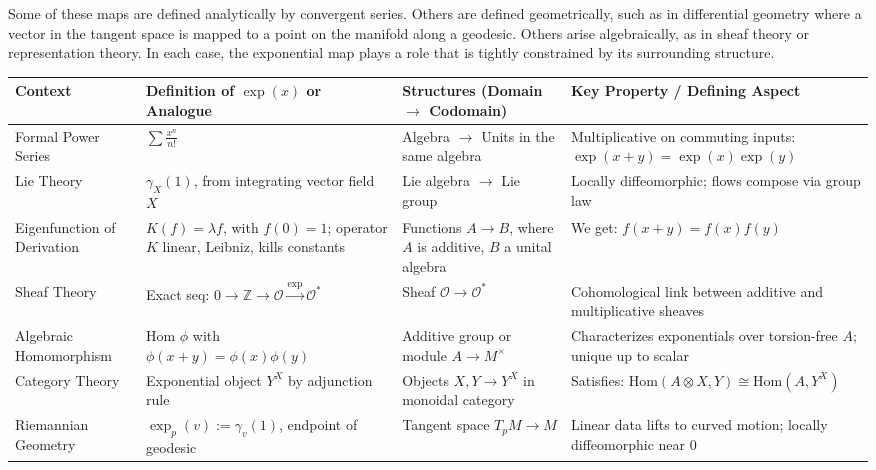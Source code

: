 Some of these maps are defined analytically by convergent series. Others are defined geometrically, such as in differential geometry where a vector in the tangent space is mapped to a point on the manifold along a geodesic. Others arise algebraically, as in sheaf theory or representation theory. In each case, the exponential map plays a role that is tightly constrained by its surrounding structure.


\begin{center}
\renewcommand{\arraystretch}{1.65}
\setlength{\tabcolsep}{2.5pt}
\small
\begin{tabular}{|>{\centering\arraybackslash}m{2.4cm}|>{\centering\arraybackslash}m{3.2cm}|>{\centering\arraybackslash}m{4.6cm}|>{\centering\arraybackslash}m{5.0cm}|}
\hline
\textbf{Context} &
\textbf{Definition of \( \exp(x) \) or Analogue} &
\textbf{Structures (Domain \( \to \) Codomain)} &
\textbf{Key Property / Defining Aspect} \\
\hline
Formal Power Series &
\( \sum \frac{x^n}{n!} \) &
Algebra \( \to \) Units in the same algebra &
Multiplicative on commuting inputs: \( \exp(x+y) = \exp(x)\exp(y) \) \\
\hline
Lie Theory &
\( \gamma_X(1) \), from integrating vector field \( X \) &
Lie algebra \( \to \) Lie group &
Locally diffeomorphic; flows compose via group law \\
\hline
Eigenfunction of Derivation &
\( K(f) = \lambda f \), with \( f(0) = 1 \); operator \( K \) linear, Leibniz, kills constants &
Functions \( A \to B \), where \( A \) is additive, \( B \) a unital algebra &
We get: \( f(x+y) = f(x)f(y) \) \\
\hline
Sheaf Theory &
Exact seq: \( 0 \to \mathbb{Z} \to \mathcal{O} \xrightarrow{\exp} \mathcal{O}^* \) &
Sheaf \( \mathcal{O} \to \mathcal{O}^* \) &
Cohomological link between additive and multiplicative sheaves \\
\hline
Algebraic Homomorphism &
Hom \( \phi \) with \( \phi(x+y) = \phi(x)\phi(y) \) &
Additive group or module \( A \to M^\times \) &
Characterizes exponentials over torsion-free \( A \); unique up to scalar \\
\hline
Category Theory &
Exponential object \( Y^X \) by adjunction rule &
Objects \( X, Y \to Y^X \) in monoidal category &
Satisfies: \( \mathrm{Hom}(A \otimes X, Y) \cong \mathrm{Hom}(A, Y^X) \) \\
\hline
Riemannian Geometry &
\( \exp_p(v) := \gamma_v(1) \), endpoint of geodesic &
Tangent space \( T_p M \to M \) &
Linear data lifts to curved motion; locally diffeomorphic near \( 0 \) \\
\hline
\end{tabular}
\end{center}

